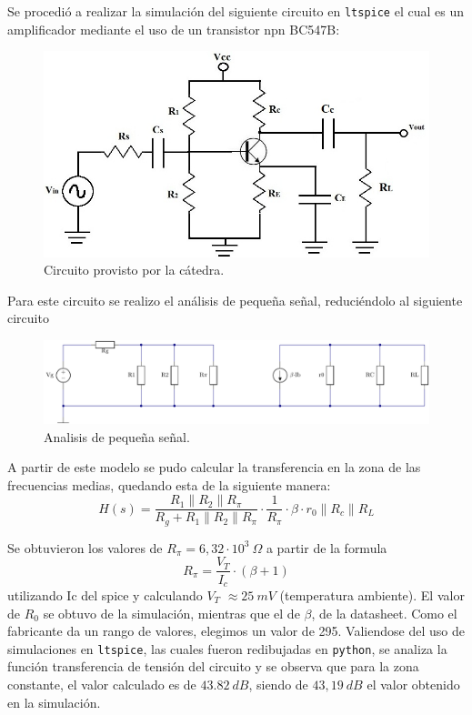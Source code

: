 \documentclass[a4paper]{article}
\begin{document}
Se procedió a realizar la simulación del siguiente circuito en \texttt{ltspice} el cual es un amplificador mediante el uso de un transistor npn BC547B:
\begin{figure}[H]
	\centering
	\includegraphics[width=0.6 \textwidth]{commonEmitter.jpg}	
	\caption{Circuito provisto por la cátedra.}
	\label{fig:cmnemitnpn}

\end{figure}

Para este circuito se realizo el análisis de pequeña señal, reduciéndolo al siguiente circuito
\begin{figure}[H]
	\centering
	\includegraphics[width=1 \textwidth]{CircEq.PNG}	
	\caption{Analisis de pequeña señal.}
	\label{fig:littleSignal}
\end{figure}

A partir de este modelo se pudo calcular la transferencia en la zona de las frecuencias medias, quedando esta de la siguiente manera: \[H(s)=\frac{R_1\parallel R_2\parallel R_\pi}{R_g+R_1\parallel R_2\parallel R_\pi}\cdot \frac{1}{R_\pi} \cdot \beta \cdot r_0 \parallel R_c \parallel R_L  \]

Se obtuvieron los valores de $R_\pi = 6,32 \cdot 10^{3} \ \Omega$ a partir de la formula \[R_\pi = \frac{V_T}{I_c}\cdot (\beta +1) \] utilizando Ic del spice y calculando $V_T$ $\approx 25 \ mV$ (temperatura ambiente).
El valor de $R_0$ se obtuvo de la simulación, mientras que el de $\beta$, de la datasheet. Como el fabricante da un rango de valores, elegimos un valor de 295.
Valiendose del uso de simulaciones en \texttt{ltspice}, las cuales fueron redibujadas en \texttt{python}, se analiza la función transferencia de tensión del circuito y se observa que para la zona constante, el valor calculado es de $43.82 \ dB$, siendo de $43,19 \ dB$ el valor obtenido en la simulación.
\end{document}
